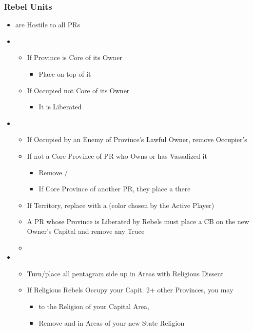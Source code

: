 \documentclass[10pt]{article}
\begin{document}
\subsubsection*{Rebel Units}
\begin{itemize}
	\item \rebels are Hostile to all PRs
	\item {}
	\begin{itemize}
		\item If Province is Core of its Owner
		\begin{itemize}
			\item Place \rebeltown on top of it
		\end{itemize}
		\item If Occupied  not Core of its Owner
		\begin{itemize}
			\item It is Liberated
		\end{itemize}
	\end{itemize}
	\item {}
	\begin{itemize}
		\item If Occupied by an Enemy of Province's Lawful Owner, remove Occupier's \town
		\item If not a Core Province of PR who Owns or has Vassalized it
		\begin{itemize}
			\item Remove \town/\vassal
			\item If Core Province of another PR, they place a \town there
		\end{itemize}
		\item If Territory, replace \town with a \dnpr (color chosen by the Active Player)
		\item A PR whose Province is Liberated by Rebels must place a CB on the new Owner's Capital and remove any Truce
		\item {}
	\end{itemize}
	\item {}
	\begin{itemize}
		\item Turn/place all \rebeltowns pentagram side up in Areas with Religious Dissent
		\item If Religious Rebels Occupy your Capit.  2+ other Provinces, you may
		\begin{itemize}
			\item {} to the Religion of your Capital Area, 
			\item Remove \rebels and \rebeltowns in Areas of your new State Religion
		\end{itemize}
	\end{itemize}
\end{itemize}
\end{document}
